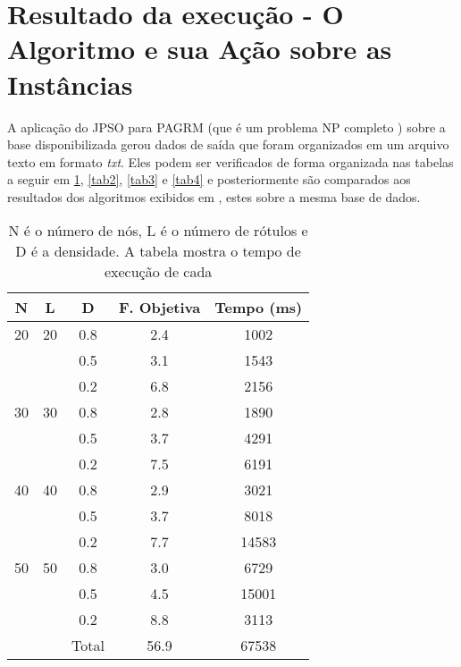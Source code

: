 \documentclass{sig-alternate-05-2015}
\begin{document}
\section*{Resultado da execução - O Algoritmo e sua Ação sobre as Instâncias} \label{sec4}
A aplicação do JPSO para PAGRM (que é um problema NP completo \cite{}) sobre a base disponibilizada gerou dados de saída que foram organizados em um arquivo texto em formato \textit{txt}. Eles podem ser verificados de forma organizada nas tabelas a seguir em \ref{tab1}, \ref{tab2}, \ref{tab3} e \ref{tab4} e posteriormente são comparados aos resultados dos algoritmos exibidos em \cite{}, estes sobre a mesma base de dados. 
\begin{table}[!h]
	

\begin{tabular}{ccccc}

	\hline \rule[-2ex]{0pt}{5.5ex} N & L & D & F. Objetiva & Tempo (ms) \\ 
	\hline \rule[-2ex]{0pt}{5.5ex} 20 & 20 & 0.8 & 2.4 & 1002 \\ 
	 \rule[-2ex]{0pt}{5.5ex}  &  & 0.5 & 3.1 & 1543 \\ 
	 \rule[-2ex]{0pt}{5.5ex}  &  & 0.2 & 6.8 & 2156 \\ 
	 \rule[-2ex]{0pt}{5.5ex} 30 & 30 & 0.8 & 2.8 & 1890 \\ 
	 \rule[-2ex]{0pt}{5.5ex}  &  & 0.5 & 3.7 & 4291 \\ 
	 \rule[-2ex]{0pt}{5.5ex}  &  & 0.2 & 7.5 & 6191 \\ 
	 \rule[-2ex]{0pt}{5.5ex} 40 & 40 & 0.8 & 2.9 & 3021 \\ 
	 \rule[-2ex]{0pt}{5.5ex}  &  & 0.5 & 3.7 & 8018 \\ 
	 \rule[-2ex]{0pt}{5.5ex}  &  & 0.2 & 7.7 & 14583 \\ 
	 \rule[-2ex]{0pt}{5.5ex} 50 & 50 & 0.8 & 3.0 & 6729 \\ 
	 \rule[-2ex]{0pt}{5.5ex}  &  & 0.5 & 4.5 & 15001 \\ 
	 \rule[-2ex]{0pt}{5.5ex}  &  & 0.2 & 8.8 & 3113 \\ 
	\hline \rule[-2ex]{0pt}{5.5ex}  &  & Total & 56.9 & 67538 \\ 
	\hline 
\end{tabular} 

\caption{N é o número de nós, L é o número de rótulos e D é a densidade.  A tabela mostra o tempo de execução de cada}
\label{tab1}
\end{table}
\end{document}
